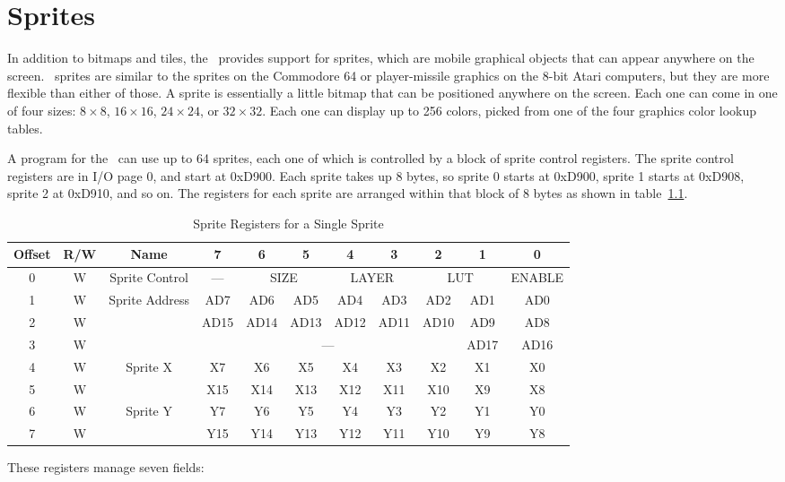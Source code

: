 \chapter{Sprites}

In addition to bitmaps and tiles, the \jr\ provides support for sprites, which are mobile graphical objects that can appear anywhere on the screen. \jr\ sprites are similar to the sprites on the Commodore 64 or player-missile graphics on the 8-bit Atari computers, but they are more flexible than either of those. A sprite is essentially a little bitmap that can be positioned anywhere on the screen. Each one can come in one of four sizes: $8 \times 8$, $16 \times 16$, $24 \times 24$, or $32 \times 32$. Each one can display up to 256 colors, picked from one of the four graphics color lookup tables.

A program for the \jr\ can use up to 64 sprites, each one of which is controlled by a block of sprite control registers. The sprite control registers are in I/O page 0, and start at 0xD900. Each sprite takes up 8 bytes, so sprite 0 starts at 0xD900, sprite 1 starts at 0xD908, sprite 2 at 0xD910, and so on. The registers for each sprite are arranged within that block of 8 bytes as shown in table~\ref{tab:sp_reg}.

\begin{table}[ht]
    \begin{center}
        \begin{tabular}{|c|c|c|c|c|c|c|c|c|c|c|} \hline
            Offset & R/W & Name & 7 & 6 & 5 & 4 & 3 & 2 & 1 & 0 \\ \hline\hline
            0 & W & Sprite Control & --- & \multicolumn{2}{|c|}{SIZE} & \multicolumn{2}{|c|}{LAYER} & \multicolumn{2}{|c|}{LUT} & ENABLE \\ \hline
            1 & W & \multirow{3}{*}{Sprite Address} & AD7 & AD6 & AD5 & AD4 & AD3 & AD2 & AD1 & AD0 \\ \cline{1-2}\cline{4-11}
            2 & W &  & AD15 & AD14 & AD13 & AD12 & AD11 & AD10 & AD9 & AD8 \\ \cline{1-2}\cline{4-11}
            3 & W &  & \multicolumn{6}{|c|}{---} & AD17 & AD16 \\ \hline
            4 & W & \multirow{2}{*}{Sprite X} & X7 & X6 & X5 & X4 & X3 & X2 & X1 & X0 \\ \cline{1-2}\cline{4-11}
            5 & W &  & X15 & X14 & X13 & X12 & X11 & X10 & X9 & X8 \\ \hline
            6 & W & \multirow{2}{*}{Sprite Y} & Y7 & Y6 & Y5 & Y4 & Y3 & Y2 & Y1 & Y0 \\ \cline{1-2}\cline{4-11}
            7 & W &  & Y15 & Y14 & Y13 & Y12 & Y11 & Y10 & Y9 & Y8 \\ \hline
        \end{tabular}
    \end{center}
    \caption{Sprite Registers for a Single Sprite}
    \label{tab:sp_reg}
\end{table}
These registers manage seven fields:

